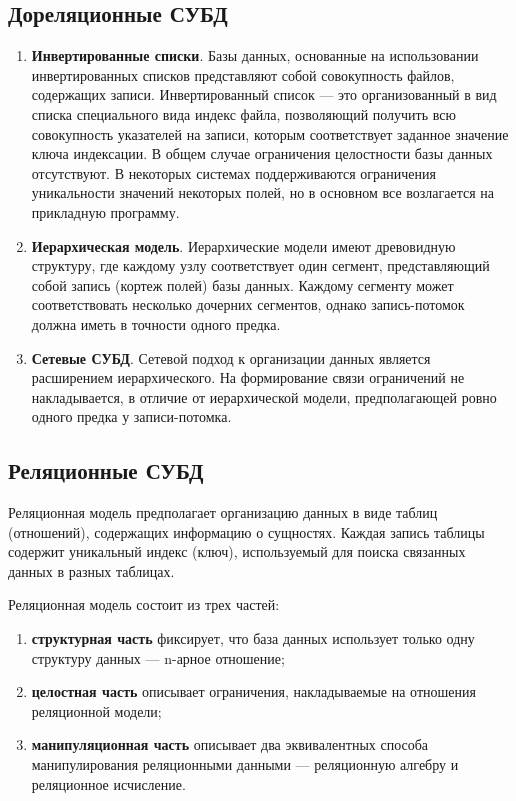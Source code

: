 \subsection*{Дореляционные СУБД}
\begin{enumerate}
	\item \textbf{Инвертированные списки}. 
	Базы данных, основанные на использовании инвертированных списков представляют собой совокупность файлов, содержащих записи.
	Инвертированный список –-- это организованный в вид списка специального вида индекс файла, позволяющий получить всю совокупность указателей на записи, которым соответствует заданное значение ключа индексации.
	В общем случае ограничения целостности базы данных отсутствуют. В некоторых системах поддерживаются ограничения уникальности значений некоторых полей, но в основном все возлагается на прикладную программу.
	\item \textbf{Иерархическая модель}.
	Иерархические модели имеют древовидную структуру, где каждому узлу соответствует один сегмент, представляющий собой запись (кортеж полей) базы данных. Каждому сегменту может соответствовать несколько дочерних сегментов, однако запись-потомок должна иметь в точности одного предка.
	\item \textbf{Сетевые СУБД}.
	Сетевой подход к организации данных является расширением иерархического. На формирование связи ограничений не накладывается, в отличие от иерархической модели, предполагающей ровно одного предка у записи-потомка.
\end{enumerate}

\subsection*{Реляционные СУБД}

Реляционная модель предполагает организацию данных в виде таблиц (отношений), содержащих информацию о сущностях. Каждая запись таблицы содержит уникальный индекс (ключ), используемый для поиска связанных данных в разных таблицах.

Реляционная модель состоит из трех частей:
\begin{enumerate}
	\item \textbf{структурная часть} фиксирует, что база данных использует только одну структуру данных --- n-арное отношение;
	\item \textbf{целостная часть} описывает ограничения, накладываемые на отношения реляционной модели;
	\item \textbf{манипуляционная часть} описывает два эквивалентных способа манипулирования реляционными данными --- реляционную алгебру и реляционное исчисление.

\end{enumerate}

